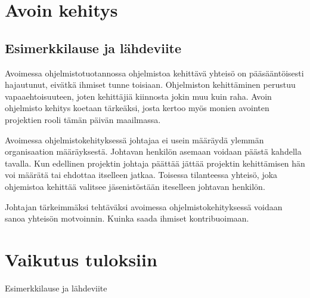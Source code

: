\documentclass[finnish]{tktltiki2}
\theoremstyle{definition}
\theoremstyle{remark}
\begin{document}
\section{Avoin kehitys}
\subsection{Esimerkkilause ja lähdeviite~\cite{Li:2006:MOS:1125170.1125182}}

Avoimessa ohjelmistotuotannossa ohjelmistoa kehittävä yhteisö on pääsääntöisesti hajautunut, eivätkä ihmiset tunne toisiaan. Ohjelmiston kehittäminen perustuu vapaaehtoisuuteen, joten kehittäjiä kiinnosta jokin muu kuin raha. Avoin ohjelmisto kehitys koetaan tärkeäksi, josta kertoo myös monien avointen projektien rooli tämän päivän maailmassa. 
 
Avoimessa ohjelmistokehityksessä johtajaa ei usein määräydä ylemmän organisaation määräyksestä. Johtavan henkilön asemaan voidaan päästä kahdella tavalla. Kun edellinen projektin johtaja päättää jättää projektin kehittämisen hän voi määrätä tai ehdottaa itselleen jatkaa. Toisessa tilanteessa yhteisö, joka ohjemistoa kehittää valitsee jäsenistöstään iteselleen johtavan henkilön.

Johtajan tärkeimmäksi tehtäväksi avoimessa ohjelmistokehityksessä  voidaan sanoa yhteisön motvoinnin. Kuinka saada ihmiset kontribuoimaan.


\section{Vaikutus tuloksiin}
Esimerkkilause ja lähdeviite~\cite{McLeod:2011:FAS:1978802.1978803}



%
%
% 
%



\end{document}
